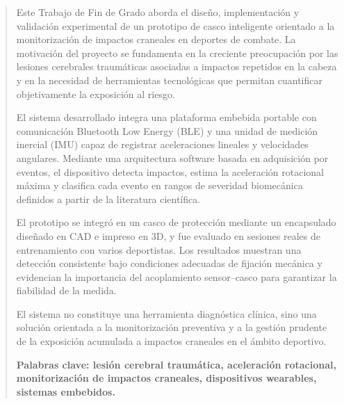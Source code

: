 \documentclass[../main.tex]{subfiles}
\begin{document}
\begin{abstract}

\vspace{30pt}

Este Trabajo de Fin de Grado aborda el diseño, implementación y validación experimental de un prototipo de casco inteligente orientado a la monitorización de impactos craneales en deportes de combate. La motivación del proyecto se fundamenta en la creciente preocupación por las lesiones cerebrales traumáticas asociadas a impactos repetidos en la cabeza y en la necesidad de herramientas tecnológicas que permitan cuantificar objetivamente la exposición al riesgo.

El sistema desarrollado integra una plataforma embebida portable con comunicación Bluetooth Low Energy (BLE) y una unidad de medición inercial (IMU) capaz de registrar aceleraciones lineales y velocidades angulares. Mediante una arquitectura software basada en adquisición por eventos, el dispositivo detecta impactos, estima la aceleración rotacional máxima y clasifica cada evento en rangos de severidad biomecánica definidos a partir de la literatura científica.

El prototipo se integró en un casco de protección mediante un encapsulado diseñado en CAD e impreso en 3D, y fue evaluado en sesiones reales de entrenamiento con varios deportistas. Los resultados muestran una detección consistente bajo condiciones adecuadas de fijación mecánica y evidencian la importancia del acoplamiento sensor--casco para garantizar la fiabilidad de la medida.

El sistema no constituye una herramienta diagnóstica clínica, sino una solución orientada a la monitorización preventiva y a la gestión prudente de la exposición acumulada a impactos craneales en el ámbito deportivo.

\vspace{12pt}

\bfseries{\large{Palabras clave:}} lesión cerebral traumática, aceleración rotacional, monitorización de impactos craneales, dispositivos wearables, sistemas embebidos.

\end{abstract}
\end{document}
